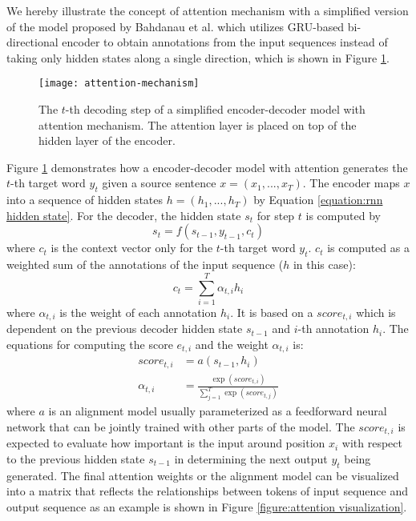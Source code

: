 We hereby illustrate the concept of attention mechanism with a simplified version of the model proposed by Bahdanau et al. \cite{Bahdanau2014} which utilizes GRU-based bi-directional encoder to obtain annotations from the input sequences instead of taking only hidden states along a single direction, which is shown in Figure \ref{figure:attention mechanism}.

\begin{figure}[h]
\texttt{[image: attention-mechanism]}
\centering
\caption{The $ t $-th decoding step of a simplified encoder-decoder model with attention mechanism. The attention layer is placed on top of the hidden layer of the encoder.}
\label{figure:attention mechanism}
\end{figure}

Figure \ref{figure:attention mechanism} demonstrates how a encoder-decoder model with attention generates the $ t $-th target word $ y_{t} $ given a source sentence $ x = (x_{1},...,x_{T}) $. The encoder maps $ x $ into a sequence of hidden states $ h = (h_{1},...,h_{T}) $ by Equation \ref{equation:rnn hidden state}. For the decoder, the hidden state $ s_{t} $ for step $ t $ is computed by
\[ s_{t} = f(s_{t-1}, y_{t-1}, c_{t}) \]
where $ c_{t} $ is the context vector only for the $ t $-th target word $ y_{t} $. $ c_{t} $ is computed as a weighted sum of the annotations of the input sequence ($ h $ in this case):
\[ c_{t} = \sum_{i=1}^{T}\alpha_{t,i}h_{i} \]
where $ \alpha_{t,i} $ is the weight of each annotation $ h_{i} $. It is based on a $ score_{t,i} $ which is dependent on the previous decoder hidden state $ s_{t-1} $ and $ i $-th annotation $ h_{i} $. The equations for computing the score $ e_{t,i} $ and the weight $ \alpha_{t,i} $ is:
\begin{align*}
score_{t,i} &= a(s_{t-1}, h_{i}) \\
\alpha_{t,i} &= \frac{\exp(score_{t,i})}{\sum_{j=1}^{T}\exp(score_{t,j})}
\end{align*} 
where $ a $ is an alignment model usually parameterized as a feedforward neural network that can be jointly trained with other parts of the model. The $ score_{t,i} $ is expected to evaluate how important is the input around position $ x_{i} $ with respect to the previous hidden state $ s_{t-1} $ in determining the next output $ y_{t} $ being generated. The final attention weights or the alignment model can be visualized into a matrix that reflects the relationships between tokens of input sequence and output sequence as an example is shown in Figure \ref{figure:attention visualization}.

